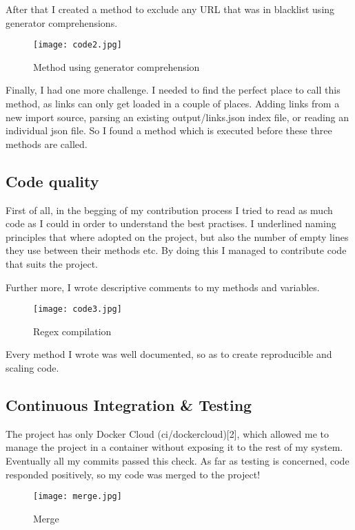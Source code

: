 \documentclass{article}
\begin{document}
After that I created a method to exclude any URL that was in blacklist using generator comprehensions. 

\begin{figure}[tph!]
\centerline{\texttt{[image: code2.jpg]}}
    \caption{Method using generator comprehension}
    \label{fig:verticalcell}
\end{figure}

Finally, I had one more challenge. I needed to find the perfect place to call this method, as links can only get loaded in a couple of places. Adding links from a new import source, parsing an existing output/links.json index file, or reading an individual json file. So I found a method which is executed before these three methods are called. 

\subsection{Code quality}

First of all, in the begging of my contribution process I tried to read as much code as I could in order to understand the best practises. I underlined naming principles that where adopted on the project, but also the number of empty lines they use between their methods etc. By doing this I managed to contribute code that suits the project.

Further more, I wrote descriptive comments to my methods and variables. 
\begin{figure}[tph!]
\centerline{\texttt{[image: code3.jpg]}}
    \caption{Regex compilation}
    \label{fig:verticalcell}
\end{figure}

Every method I wrote was well documented, so as to create reproducible and scaling code.

\subsection{Continuous Integration \& Testing}
The project has only Docker Cloud (ci/dockercloud)[2], which allowed me to manage the project in a container without exposing it to the rest of my system. Eventually all my commits passed this check. As far as testing is concerned, code responded positively, so my code was merged to the project!

\begin{figure}[tph!]
\centerline{\texttt{[image: merge.jpg]}}
    \caption{Merge}
    \label{fig:verticalcell}
\end{figure}
\end{document}
